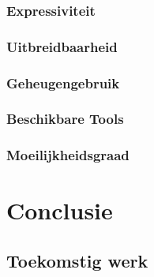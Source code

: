 \documentclass[12pt,a4paper,oneside]{book}
\theoremstyle{definition}
\begin{document}
\subsection{Expressiviteit}
\subsection{Uitbreidbaarheid}
\subsection{Geheugengebruik}
\subsection{Beschikbare Tools}
\subsection{Moeilijkheidsgraad}

\chapter{Conclusie}
\section{Toekomstig werk}



\end{document}
